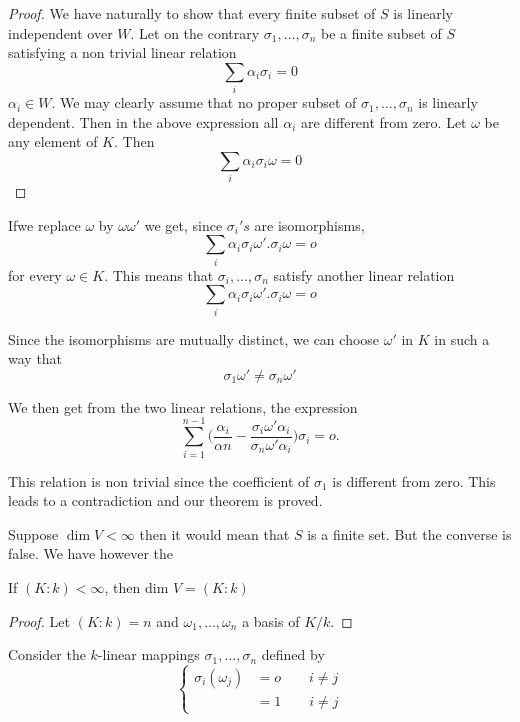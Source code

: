 \begin{proof}
We have naturally to show that every finite subset of $S$ is linearly
independent over $W$. Let on the contrary $\sigma_1 , \ldots ,
\sigma_n $ be a finite subset of $S$ satisfying a non trivial linear
relation  
$$
\sum_{i} \alpha_i \sigma_i = 0
$$
$ \alpha_i \in W $. We may clearly assume that no proper subset of $
\sigma_1 , \ldots , \sigma_n $ is linearly dependent. Then in the
above expression all $ \alpha_i $ are different from zero. Let
$\omega$ be any element of $K$. Then  
$$
\sum_{i}\alpha_i \sigma_i \omega = 0 
$$
\end{proof}

If\pageoriginale we replace $\omega$ by $\omega \omega{'}$ we get,
since $\sigma _i{'} s$ are isomorphisms,   
$$
\sum_{i} \alpha_i \sigma_i \omega{'}. \sigma_i \omega = o
$$
for every $\omega \in K$. This means that $\sigma_i ,\ldots ,
\sigma_n$ satisfy another linear relation 
$$
\sum_{i} \alpha_i \sigma_i \omega'. \sigma_i \omega = o 
$$

Since the isomorphisms are mutually distinct, we can choose
$\omega{'}$ in $K$ in such a way that  
$$
\sigma_1 \omega{'} \neq \sigma_n \omega{'}
$$

We then get from the two linear relations, the expression 
$$
\sum_{i = 1}^{n - 1} \bigg( \frac{\alpha_i}{\alpha n} - \frac{\sigma_i
  \omega{'} \alpha_i}{\sigma_n \omega{'} \alpha_i} \bigg) \sigma_i =
o. 
$$

This relation is non trivial since the coefficient of $\sigma_1$ is
different from zero. This leads to a contradiction and our theorem is
proved. 

Suppose $\dim V < \infty$ then it would mean that $S$ is a finite
set. But the converse is false. We have however the  

\begin{thm}\label{c2:thm4}%
If $(K : k) < \infty$, then dim $V = (K : k)$
\end{thm}

\begin{proof}
Let $(K : k) = n$ and $\omega_1, \ldots , \omega_n$ a basis of
$K/k$. 
\end{proof}

Consider the $k$-linear mappings $\sigma_1, \ldots , \sigma_n$ defined by 
\begin{equation*}
\begin{cases}
\sigma_i (\omega_j ) & = o \qquad i \neq j \\
 &=  1  \qquad  i \neq j
\end{cases}
\end{equation*}

